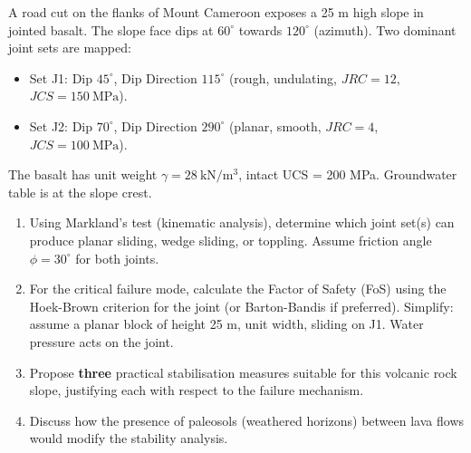 \documentclass[11pt]{article}
\newcommand{\cle}[1]{{\popxbold\color{popdark}#1}}
\begin{document}
\begin{exercice}
A road cut on the flanks of \cle{Mount Cameroon} exposes a 25 m high slope in jointed basalt. The slope face dips at $60^\circ$ towards $120^\circ$ (azimuth). Two dominant joint sets are mapped:
\begin{itemize}
\item Set J1: Dip $45^\circ$, Dip Direction $115^\circ$ (rough, undulating, $JRC = 12$, $JCS = 150\ \mathrm{MPa}$).
\item Set J2: Dip $70^\circ$, Dip Direction $290^\circ$ (planar, smooth, $JRC = 4$, $JCS = 100\ \mathrm{MPa}$).
\end{itemize}
The basalt has unit weight $\gamma = 28\ \mathrm{kN/m^3}$, intact UCS = 200 MPa. Groundwater table is at the slope crest.

\begin{enumerate}
\item Using \cle{Markland's test} (kinematic analysis), determine which joint set(s) can produce planar sliding, wedge sliding, or toppling. Assume friction angle $\phi = 30^\circ$ for both joints.
\item For the critical failure mode, calculate the Factor of Safety (FoS) using the \cle{Hoek-Brown} criterion for the joint (or Barton-Bandis if preferred). Simplify: assume a planar block of height 25 m, unit width, sliding on J1. Water pressure acts on the joint.
\item Propose \textbf{three} practical stabilisation measures suitable for this volcanic rock slope, justifying each with respect to the failure mechanism.
\item Discuss how the presence of \cle{paleosols} (weathered horizons) between lava flows would modify the stability analysis.
\end{enumerate}
\end{exercice}
\end{document}

